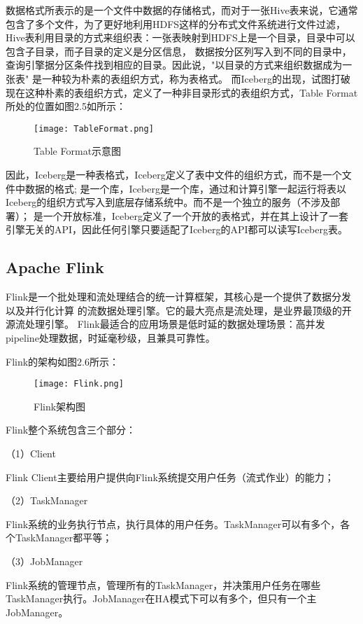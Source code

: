 数据格式所表示的是一个文件中数据的存储格式，而对于一张Hive表来说，它通常包含了多个文件，为了更好地利用HDFS这样的分布式文件系统进行文件过滤，
Hive表利用目录的方式来组织表：一张表映射到HDFS上是一个目录，目录中可以包含子目录，而子目录的定义是分区信息，
数据按分区列写入到不同的目录中，查询引擎据分区条件找到相应的目录。因此说，"以目录的方式来组织数据成为一张表"
是一种较为朴素的表组织方式，称为表格式。
而Iceberg的出现，试图打破现在这种朴素的表组织方式，定义了一种非目录形式的表组织方式，Table Format所处的位置如图2.5如所示：

\begin{figure}[h]
  \centering
  \texttt{[image: TableFormat.png]}
  \caption{Table Format示意图}
  \label{fig:badge}
\end{figure}

因此，Iceberg是一种表格式，Iceberg定义了表中文件的组织方式，而不是一个文件中数据的格式;
是一个库，Iceberg是一个库，通过和计算引擎一起运行将表以Iceberg的组织方式写入到底层存储系统中。而不是一个独立的服务（不涉及部署）；
是一个开放标准，Iceberg定义了一个开放的表格式，并在其上设计了一套引擎无关的API，因此任何引擎只要适配了Iceberg的API都可以读写Iceberg表。

\subsection{Apache Flink}

Flink是一个批处理和流处理结合的统一计算框架，其核心是一个提供了数据分发以及并行化计算
的流数据处理引擎。它的最大亮点是流处理，是业界最顶级的开源流处理引擎。
Flink最适合的应用场景是低时延的数据处理场景：高并发pipeline处理数据，时延毫秒级，且兼具可靠性。

Flink的架构如图2.6所示：

\begin{figure}[h]
  \centering
  \texttt{[image: Flink.png]}
  \caption{Flink架构图}
  \label{fig:badge}
\end{figure}

Flink整个系统包含三个部分：

（1）Client

Flink Client主要给用户提供向Flink系统提交用户任务（流式作业）的能力；

（2）TaskManager

Flink系统的业务执行节点，执行具体的用户任务。TaskManager可以有多个，各个TaskManager都平等；

（3）JobManager

Flink系统的管理节点，管理所有的TaskManager，并决策用户任务在哪些TaskManager执行。JobManager在HA模式下可以有多个，但只有一个主JobManager。

